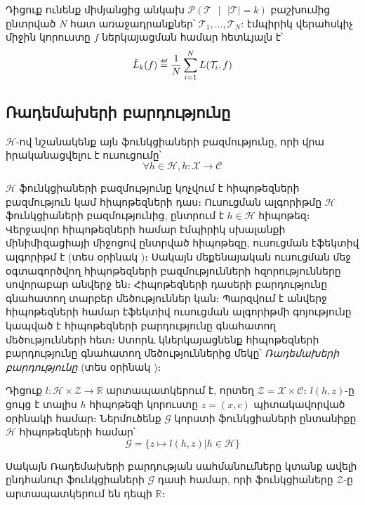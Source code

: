\documentclass[12pt]{article}
\newcommand\defeq{\mathrel{\overset{\makebox[0pt]{\mbox{\normalfont\tiny\sffamily def}}}{=}}}
\begin{document}
\begin{defination}
Դիցուք ունենք միմյանցից անկախ $\mathcal{P}(\mathcal{T} \text{ } |\text{ }  |\mathcal{T}| = k)$ բաշխումից ընտրված $N$ հատ առաջադրանքներ՝ $\mathcal{T}_1, ..., \mathcal{T}_N$:
էմպիրիկ վերահսկիչ միջին կորուստը $f$ ներկայացման համար հետևյալն է՝ 
$$\hat{L}_{k}(f) \defeq \frac{1}{N}\sum_{i=1}^{N}L (\mathcal{T}_i, f)$$
\end{defination}
\pagebreak

\subsection*{\hfill Ռադեմախերի բարդությունը \hfill} \noindent

{}

$\mathcal{H}$-ով նշանակենք այն ֆունկցիաների բազմությունը, որի վրա իրականացվելու է ուսուցումը՝
$$\forall h \in \mathcal{H}, h:\mathcal{X} \rightarrow \mathcal{C}$$

\noindent $\mathcal{H}$ ֆունկցիաների բազմությունը կոչվում է հիպոթեզների բազմություն կամ հիպոթեզների դաս։ Ուսուցման ալգորիթմը $\mathcal{H}$ ֆունկցիաների բազմությունից, ընտրում է $h \in \mathcal{H}$ հիպոթեզ։
 Վերջավոր հիպոթեզների համար էմպիրիկ սխալանքի մինիմիզացիայի միջոցով ընտրված հիպոթեզը, ուսուցման էֆեկտիվ ալգորիթմ է (տես օրինակ \cite{bib_item_9, bib_item_10})։ Սակայն մեքենայական ուսուցման մեջ օգտագործվող հիպոթեզների բազմությունների հզորությունները սովորաբար անվերջ են։ 
Հիպոթեզների դասերի բարդությունը գնահատող տարբեր մեծություններ կան։ Պարզվում է անվերջ հիպոթեզների համար էֆեկտիվ ուսուցման ալգորիթմի գոյությունը կապված է հիպոթեզների բարդությունը գնահատող մեծությունների հետ։ Ստորև կներկայացնենք հիպոթեզների բարդությունը գնահատող մեծություններից մեկը՝   \textit{Ռադեմախերի բարդությունը} (տես օրինակ \cite{bib_item_9, bib_item_10})։

\par Դիցուք $l:\mathcal{H}\times \mathcal{Z} \rightarrow \mathbb{R}$ արտապատկերում է, որտեղ $\mathcal{Z} = \mathcal{X} \times \mathcal{C}$։ $l(h, z)$-ը ցույց է տալիս $h$ հիպոթեզի կորուստը $z = (x, c)$  պիտակավորված օրինակի համար։ Ներմուծենք $\mathcal{G}$ կորստի ֆունկցիաների ընտանիքը $\mathcal{H}$ հիպոթեզների համար՝
$$\mathcal{G} = \{z \mapsto l(h, z) | h \in \mathcal{H}\}$$

Սակայն Ռադեմախերի բարդության սահմանումները կտանք ավելի ընդհանուր ֆունկցիաների $\mathcal{G}$ դասի համար, որի ֆունկցիաները $\mathcal{Z}$-ը արտապատկերում են դեպի $\mathbb{R}$։
\end{document}
